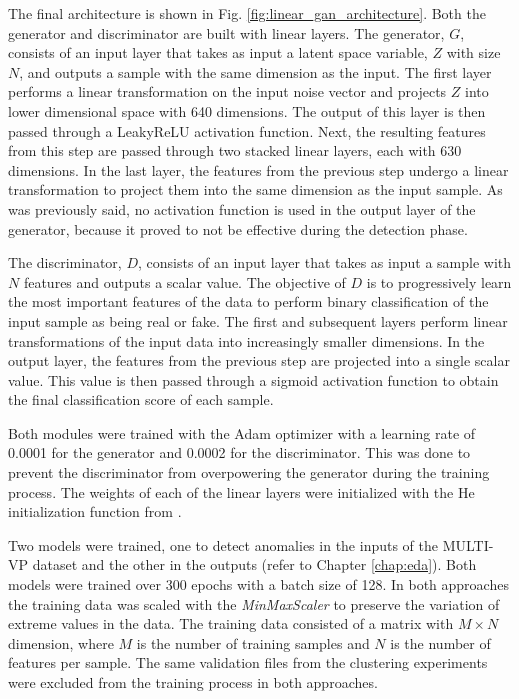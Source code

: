 The final architecture is shown in Fig. \ref{fig:linear_gan_architecture}. Both the generator and discriminator are built with linear layers. The generator, $G$, consists of an input layer that takes as input a latent space variable, $Z$ with size $N$, and outputs a sample with the same dimension as the input. The first layer performs a linear transformation on the input noise vector and projects $Z$ into lower dimensional space with 640 dimensions. The output of this layer is then passed through a LeakyReLU activation function. Next, the resulting features from this step are passed through two stacked linear layers, each with 630 dimensions. In the last layer, the features from the previous step undergo a linear transformation to project them into the same dimension as the input sample. As was previously said, no activation function is used in the output layer of the generator, because it proved to not be effective during the detection phase.

The discriminator, $D$, consists of an input layer that takes as input a sample with $N$ features and outputs a scalar value. The objective of $D$ is to progressively learn the most important features of the data to perform binary classification of the input sample as being real or fake. The first and subsequent layers perform linear transformations of the input data into increasingly smaller dimensions. In the output layer, the features from the previous step are projected into a single scalar value. This value is then passed through a sigmoid activation function to obtain the final classification score of each sample.

Both modules were trained with the Adam optimizer with a learning rate of 0.0001 for the generator and 0.0002 for the discriminator. This was done to prevent the discriminator from overpowering the generator during the training process. The weights of each of the linear layers were initialized with the He initialization function from \cite{He.Zhang.ea_DelvingDeepRectifiers_2015}.

Two models were trained, one to detect anomalies in the inputs of the MULTI-VP dataset and the other in the outputs (refer to Chapter \ref{chap:eda}). Both models were trained over 300 epochs with a batch size of 128. In both approaches the training data was scaled with the \textit{MinMaxScaler} to preserve the variation of extreme values in the data. The training data consisted of a matrix with $M\times N$ dimension, where $M$ is the number of training samples and $N$ is the number of features per sample. The same validation files from the clustering experiments were excluded from the training process in both approaches.

